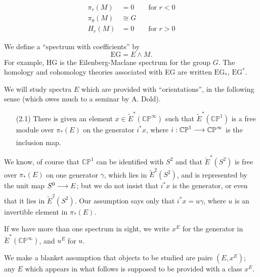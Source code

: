 \documentclass[../main]{subfiles}
\begin{document}
\begin{align*}
\pi_r(M) & = 0 \qquad \text {for } r < 0 \\ \pi_0(M) & \cong G \\ H_r(M) & = 0 \qquad \text {for } r > 0
\end{align*}

We define a ``spectrum with coefficients'' by \[\mathrm{EG} = E \wedge M.\] For example, HG is the Eilenberg-Maclane spectrum for the group $G$. The homology and cohomology theories associated with EG are written $\mathrm {EG}_\ast$, $\mathrm {EG}^\ast$.

We will study spectra $E$ which are provided with ``orientations'', in the following sense (which owes much to a seminar by A. Dold). 

\begin{enumerate}
    \item[(2.1)] There is given an element $x \in {\tilde E}^\ast(\mathbb {CP}^\infty)$ such that ${\tilde E}^\ast(\mathbb {CP}^1)$ is a free module over $\pi_\ast(E)$ on the generator $i^\ast x$, where $i : \mathbb {CP}^1 \lar{} \mathbb {CP}^\infty$ is the inclusion map. 
\end{enumerate}

We know, of course that $\mathbb {CP}^1$ can be identified with $S^2$ and that ${\breve E}^\ast(S^2)$ is free over $\pi_\ast(E)$ on one generator $\gamma$, which lies in ${\tilde E}^2(S^2)$, and is represented by the unit map $S^0 \lar{} E$; but we do not insist that $i^\ast x$ is the generator, or even that it lies in ${\tilde E}^2(S^2)$. Our assumption says only that $i^\ast x = u \gamma$, where $u$ is an invertible element in $\pi_\ast(E)$. 

If we have more than one spectrum in sight, we write $x^E$ for the generator in ${\breve E}^\ast(\mathbb {CP}^\infty)$, and $u^E$ for $u$.

We make a blanket assumption that objects to be studied are pairs $(E, x^E)$; any $E$ which appears in what follows is supposed to be provided with a class $x^E$. 
\end{document}
